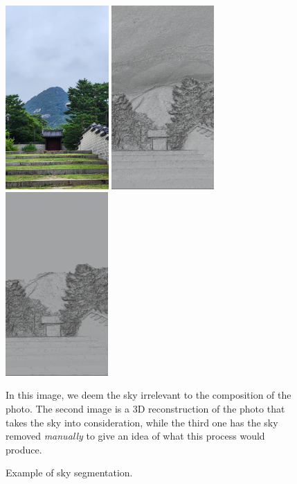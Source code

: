 \documentclass[12pt, letterpaper]{article}
\begin{document}
\begin{spacing}{1.15}
\begin{figure}[!ht]
    \begin{center}
        \includegraphics[height = 7cm]{20240630_143910}
        \includegraphics[height = 7cm]{20240630_143910_3d}
        \includegraphics[height = 7cm]{20240630_143910_3dsky}
        \caption{Example of sky segmentation.}
        \label{skyseg}
    \end{center}
    \small
    In this image, we deem the sky irrelevant to the composition of the photo. The second image is a 3D reconstruction of the photo that takes the sky
    into consideration, while the third one has the sky removed \emph{manually} to give an idea of what this process would produce.
\end{figure}


\end{spacing}
\end{document}
